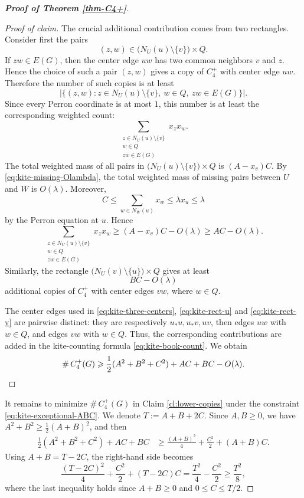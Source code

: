 \documentclass[10pt,a4paper]{amsart}
\renewcommand{\le}{\leqslant}
\renewcommand{\ge}{\geqslant}
\begin{document}
\begin{proof}[{\bf Proof of Theorem \ref{thm-C4+}}]
\begin{proof}[Proof of claim]
The crucial additional contribution comes from two rectangles.  Consider first
the pairs
\[
        (z,w)\in \bigl(N_U(u)\setminus\{v\}\bigr)\times Q.
\]
If \(zw\in E(G)\), then the center edge \(uw\) has two common neighbors
\(v\) and \(z\).  Hence the choice of such a pair \((z,w)\) gives a copy of
\(C_4^+\) with center edge \(uw\).  Therefore the number of such copies is at
least
\[
        \left|\{(z,w): z\in N_U(u)\setminus\{v\},\ w\in Q,\ zw\in E(G)\}\right|.
\]
Since every Perron coordinate is at most \(1\), this number is at least the
corresponding weighted count:
\[
        \sum_{\substack{z\in N_U(u)\setminus\{v\}\\ w\in Q\\ zw\in E(G)}}x_zx_w.
\]
The total weighted mass of all pairs in
\(\bigl(N_U(u)\setminus\{v\}\bigr)\times Q\) is \((A-x_v)C\).  By
\eqref{eq:kite-missing-Olambda}, the total weighted mass of missing pairs
between \(U\) and \(W\) is \(O(\lambda)\).  Moreover,
\[
        C\le \sum_{w\in N_W(u)}x_w\le \lambda x_u\le \lambda
\]
by the Perron equation at \(u\).  Hence
\begin{equation}\label{eq:kite-rect-u} 
        \sum_{\substack{z\in N_U(u)\setminus\{v\}\\ w\in Q\\ zw\in E(G)}}x_zx_w
        \ge
        (A-x_v)C-O(\lambda) \ge
        AC-O(\lambda). 
\end{equation}
Similarly, the rectangle
$   \bigl(N_U(v)\setminus\{u\}\bigr)\times Q$ 
gives at least
\begin{equation}\label{eq:kite-rect-v}
        BC-O(\lambda)
\end{equation}
additional copies of \(C_4^+\) with center edges \(vw\), where \(w\in Q\).

The center edges used in \eqref{eq:kite-three-centers},
\eqref{eq:kite-rect-u} and \eqref{eq:kite-rect-v} are pairwise distinct:
they are respectively \(u_*u,u_*v,uv\), then edges \(uw\) with \(w\in Q\), and
edges \(vw\) with \(w\in Q\).  Thus, the corresponding contributions are 
added in the kite-counting formula \eqref{eq:kite-book-count}.  We obtain
\begin{equation*}  
        \texttt{\#}\, C_4^+(G) 
        \ge
        \frac12(A^2+B^2+C^2)+AC+BC-O(\lambda). 
        \qedhere 
\end{equation*}
\end{proof}

It remains to minimize $\texttt{\#}\, C_4^+(G)$ in Claim \ref{cl:lower-copies} under the constraint 
\eqref{eq:kite-exceptional-ABC}. We denote 
$   T:=A+B+2C $.   
Since $A,B\ge 0$, we have \(A^2+B^2\ge \frac{1}{2}(A+B)^2\), and then 
\[
\begin{aligned}
        \frac12(A^2+B^2+C^2)+AC+BC
        &\ge
        \frac{(A+B)^2}{4}+\frac{C^2}{2}+(A+B)C.
\end{aligned}
\]
Using \(A+B=T-2C\), the right-hand side becomes
\[
        \frac{(T-2C)^2}{4}+\frac{C^2}{2}+(T-2C)C
        =
        \frac{T^2}{4}-\frac{C^2}{2} \ge \frac{T^2}{8},
\]
where the last inequality holds since \(A+B\ge0\) and \(0\le C\le T/2\).  


\end{proof}
\end{document}
